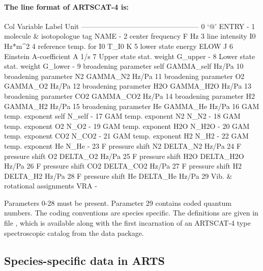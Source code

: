 \paragraph*{The line format of ARTSCAT-4 is:}
\begin{code}

Col  Variable                        Label    Unit
--------------------------------------------------
 0   `@'                             ENTRY       -
 1   molecule & isotopologue tag      NAME       -
 2   center frequency                    F      Hz
 3   line intensity                     I0  Hz*m^2
 4   reference temp. for I0           T_I0       K
 5   lower state energy               ELOW       J
 6   Einstein A-coefficient              A     1/s 
 7   Upper state stat. weight      G_upper       -
 8   Lower state stat. weight      G_lower       -
 9   broadening parameter self  GAMMA_self   Hz/Pa
10   broadening parameter N2      GAMMA_N2   Hz/Pa
11   broadening parameter O2      GAMMA_O2   Hz/Pa
12   broadening parameter H2O    GAMMA_H2O   Hz/Pa
13   broadening parameter CO2    GAMMA_CO2   Hz/Pa
14   broadening parameter H2      GAMMA_H2   Hz/Pa
15   broadening parameter He      GAMMA_He   Hz/Pa
16   GAM temp. exponent self        N_self       -
17   GAM temp. exponent N2            N_N2       -
18   GAM temp. exponent O2            N_O2       -
19   GAM temp. exponent H2O          N_H2O       -
20   GAM temp. exponent CO2          N_CO2       -
21   GAM temp. exponent H2            N_H2       -
22   GAM temp. exponent He            N_He       -
23   F pressure shift N2          DELTA_N2   Hz/Pa
24   F pressure shift O2          DELTA_O2   Hz/Pa   
25   F pressure shift H2O        DELTA_H2O   Hz/Pa   
26   F pressure shift CO2        DELTA_CO2   Hz/Pa   
27   F pressure shift H2          DELTA_H2   Hz/Pa   
28   F pressure shift He          DELTA_He   Hz/Pa   
29   Vib. & rotational assignments     VRA       -                      

\end{code}
Parameters 0-28 must be present. Parameter 29 contains coded quantum numbers.
The coding conventions are species specific. The definitions are given in file
, which is available along with
the first incarnation of an ARTSCAT-4 type spectroscopic catalog from the
 data package.


\subsection{Species-specific data in ARTS}

